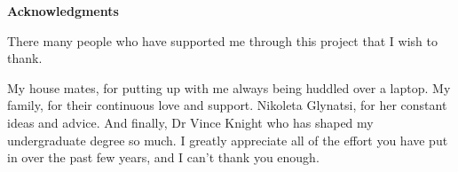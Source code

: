 
\Huge{\textbf{Acknowledgments}}

\normalsize

\vspace{1.5cm}

There many people who have supported me through this project that I wish to thank.

My house mates, for putting up with me always being huddled over a laptop.
My family, for their continuous love and support.
Nikoleta Glynatsi, for her constant ideas and advice.
And finally, Dr Vince Knight who has shaped my undergraduate degree so much.
I greatly appreciate all of the effort you have put in over the past few years, and I can't thank you enough.
